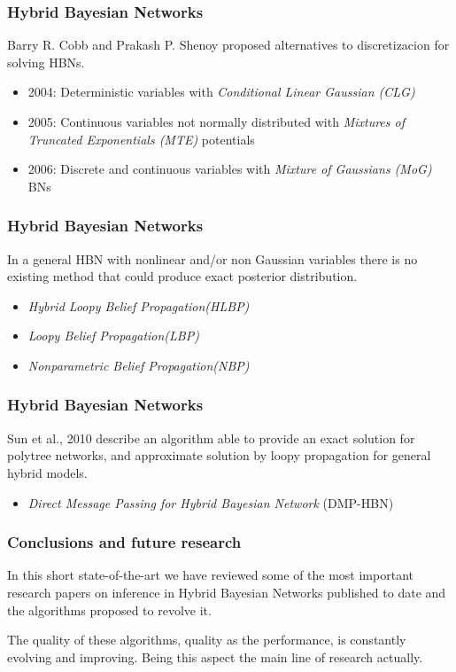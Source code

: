 \documentclass{beamer}
\begin{document}
\begin{frame}
	\frametitle{Hybrid Bayesian Networks}
	Barry R. Cobb and Prakash P. Shenoy proposed alternatives to discretizacion for solving HBNs.

	\begin{itemize}
		\item 2004: Deterministic variables with \textit{Conditional Linear Gaussian (CLG)} 

		\item 2005: Continuous variables not normally distributed with \textit{Mixtures of Truncated Exponentials (MTE)} potentials

		\item 2006: Discrete and continuous variables with \textit{Mixture of Gaussians (MoG)} BNs
	\end{itemize}
\end{frame}

\begin{frame}
	\frametitle{Hybrid Bayesian Networks}
	In a general HBN with nonlinear and/or non Gaussian variables there is no existing method that could produce exact posterior distribution.

	\begin{itemize}
		\item \textit{Hybrid Loopy Belief Propagation(HLBP)}

		\item \textit{Loopy Belief Propagation(LBP)}

		\item \textit{Nonparametric Belief Propagation(NBP)}
	\end{itemize}
\end{frame}

\begin{frame}
	\frametitle{Hybrid Bayesian Networks}
	Sun et al., 2010 describe an algorithm able to provide an exact solution for polytree networks, and approximate solution by loopy propagation for general hybrid models. 
	\begin{itemize}
		\item \textit{Direct Message Passing for Hybrid Bayesian Network} (DMP-HBN)
	\end{itemize}
\end{frame}

\begin{frame}
	\frametitle{Conclusions and future research}
In this short state-of-the-art we have reviewed some of the most important research papers on inference in Hybrid Bayesian Networks published to date and the algorithms proposed to revolve it.

The quality of these algorithms, quality as the performance, is constantly evolving and improving. Being this aspect the main line of research actually.
\end{frame}
\end{document}
